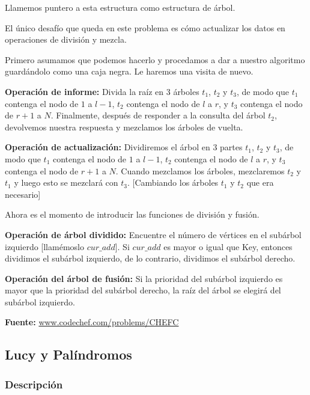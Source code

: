\documentclass[12pt]{article}
\newcommand{\nl}{\vspace{0.3cm}}
\begin{document}
Llamemos puntero a esta estructura como estructura de árbol.

\nl

El único desafío que queda en este problema es cómo actualizar los datos en operaciones de división y mezcla.

\nl

Primero asumamos que podemos hacerlo y procedamos a dar a nuestro algoritmo guardándolo como una caja negra. Le haremos una visita de nuevo.

\nl

\textbf{Operación de informe:} Divida la raíz en 3 árboles $t_1$, $t_2$ y $t_3$, de modo que $t_1$ contenga el nodo de $1$ a $l-1$, $t_2$ contenga el nodo de $l$ a $r$, y $t_3$ contenga el nodo de $r + 1$ a $N$. Finalmente, después de responder a la consulta del árbol $t_2$, devolvemos nuestra respuesta y mezclamos los árboles de vuelta.

\nl

\textbf{Operación de actualización:} Dividiremos el árbol en 3 partes $t_1$, $t_2$ y $t_3$, de modo que $t_1$ contenga el nodo de $1$ a $l-1$, $t_2$ contenga el nodo de $l$ a $r$, y $t_3$ contenga el nodo de $r + 1$ a $N$. Cuando mezclamos los árboles, mezclaremos $t_2$ y $t_1$ y luego esto se mezclará con $t_3$. [Cambiando los árboles $t_1$ y $t_2$ que era necesario]

\nl

Ahora es el momento de introducir las funciones de división y fusión.

\nl

\textbf{Operación de árbol dividido:} Encuentre el número de vértices en el subárbol izquierdo [llamémoslo $cur\_add$]. Si $cur\_add$ es mayor o igual que Key, entonces dividimos el subárbol izquierdo, de lo contrario, dividimos el subárbol derecho.

\nl

\textbf{Operación del árbol de fusión:} Si la prioridad del subárbol izquierdo es mayor que la prioridad del subárbol derecho, la raíz del árbol se elegirá del subárbol izquierdo.

\nl

\textbf{Fuente:} \href{https://www.codechef.com/problems/CHEFC}{www.codechef.com/problems/CHEFC}

\subsection{Lucy y Palíndromos}

\subsubsection{Descripción}
\end{document}
